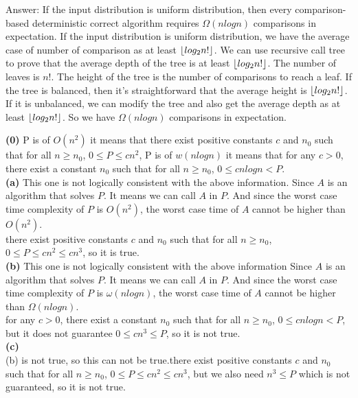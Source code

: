 \documentclass{article}
\DeclarePairedDelimiter\floor{\lfloor}{\rfloor}
\begin{document}
Answer: If the input distribution is uniform distribution, then every comparison-based deterministic correct algorithm requires $\Omega(nlogn)$ comparisons in expectation. If the input distribution is uniform distribution, we have the average case of number of comparison as at least $\floor{log_2n!}$. We can use recursive call tree to prove that the average depth of the tree is at least $\floor{log_2n!}$. The number of leaves is $n!$. The height of the tree is the number of comparisons to reach a leaf. If the tree is balanced, then it's straightforward that the average height is $\floor{log_2n!}$. If it is unbalanced, we can modify the tree and also get the average depth as at least $\floor{log_2n!}$. So we have $\Omega(nlogn)$ comparisons in expectation.\\ \newline

\textbf{(0)} P is of $O(n^2)$ it means that there exist positive constants $c$ and $n_0$ such that for all $n\geq n_0$, $0\leq P \leq c n^2$, P is of $w(nlogn)$ it means that for any $c>0$, there exist a constant $n_0$ such that for all $n\geq n_0$, $0\leq c n logn < P$. \\ \newline
\textbf{(a)} This one is not logically consistent with the above information. Since $A$ is an algorithm that solves $P$. It means we can call $A$ in $P$. And since the worst case time complexity of $P$ is $O(n^2)$, the worst case time of $A$ cannot be higher than $O(n^2)$.\\ \newline
there exist positive constants $c$ and $n_0$ such that for all $n\geq n_0$, $0\leq P \leq c n^2 \leq c n^3$, so it is true.
\\ \newline
\textbf{(b)} This one is not logically consistent with the above information Since $A$ is an algorithm that solves $P$. It means we can call $A$ in $P$. And since the worst case time complexity of $P$ is $\omega(nlogn)$, the worst case time of $A$ cannot be higher than $\Omega(nlogn)$. \\ \newline
\newline
for any $c>0$, there exist a constant $n_0$ such that for all $n\geq n_0$, $0\leq c n logn < P$, but it does not guarantee $0\leq c n^3 \leq P$, so it is not true. \\ \newline
\textbf{(c)} \\ \newline
(b) is not true, so this can not be true.there exist positive constants $c$ and $n_0$ such that for all $n\geq n_0$, $0\leq P \leq c n^2 \leq c n^3 $, but we also need $n^3 \leq P$ which is not guaranteed, so it is not true.
\\ \newline
\end{document}
